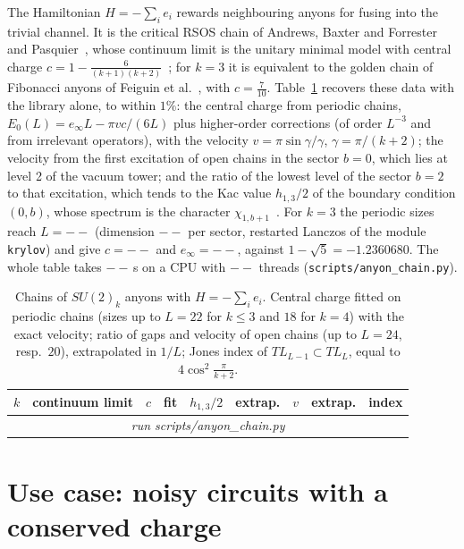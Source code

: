 \documentclass[11pt]{article}
\providecommand{\ACRows}{\multicolumn{9}{c}{\emph{run scripts/anyon\_chain.py}}\\}
\providecommand{\ACGoldenC}{--}\providecommand{\ACGoldenE}{--}\providecommand{\ACGoldenDim}{--}\providecommand{\ACGoldenL}{--}
\providecommand{\ACSeconds}{--}\providecommand{\ACThreads}{--}
\begin{document}
The Hamiltonian $H=-\sum_ie_i$ rewards neighbouring anyons for fusing into the trivial channel. It is the critical RSOS
chain of Andrews, Baxter and Forrester and Pasquier~\cite{abf1984,pasquier1987}, whose continuum limit is the unitary
minimal model with central charge $c=1-\frac6{(k+1)(k+2)}$~\cite{huse1984}; for $k=3$ it is equivalent to the golden chain
of Fibonacci anyons of Feiguin et al.~\cite{feiguin2007}, with $c=\frac7{10}$. Table~\ref{tab:anyons} recovers these data
with the library alone, to within $1\%$: the central charge from periodic chains, $E_0(L)=e_\infty L-\pi vc/(6L)$ plus
higher-order corrections (of order $L^{-3}$ and from irrelevant operators), with the velocity
$v=\pi\sin\gamma/\gamma$, $\gamma=\pi/(k+2)$; the velocity from the first excitation of open chains in the sector $b=0$,
which lies at level 2 of the vacuum tower; and the ratio of the lowest level of the sector $b=2$ to that excitation, which
tends to the Kac value $h_{1,3}/2$ of the boundary condition $(0,b)$, whose spectrum is the character
$\chi_{1,b+1}$~\cite{saleur1989}. For $k=3$ the periodic sizes reach $L=\ACGoldenL$ (dimension $\ACGoldenDim$ per sector,
restarted Lanczos of the module \texttt{krylov}) and give $c=\ACGoldenC$ and
$e_\infty=\ACGoldenE$, against $1-\sqrt5=-1.2360680$. The whole table takes $\ACSeconds$\,s on a CPU with $\ACThreads$
threads (\texttt{scripts/anyon\_chain.py}).

\begin{table}[tbp]
\centering\scriptsize
\setlength{\tabcolsep}{4pt}
\begin{tabular}{rlrrrrrrr}
\toprule
$k$ & continuum limit & $c$ & fit & $h_{1,3}/2$ & extrap. & $v$ & extrap. & index\\
\midrule
\ACRows
\bottomrule
\end{tabular}
\caption{Chains of $SU(2)_k$ anyons with $H=-\sum_ie_i$. Central charge fitted on periodic chains (sizes up to $L=22$ for
$k\le3$ and $18$ for $k=4$) with the exact velocity; ratio of gaps and velocity of open chains (up to $L=24$, resp.\ $20$),
extrapolated in $1/L$; Jones index of $TL_{L-1}\subset TL_L$, equal to $4\cos^2\frac{\pi}{k+2}$.}
\label{tab:anyons}
\end{table}

\section{Use case: noisy circuits with a conserved charge}\label{sec:noisy}
\end{document}
